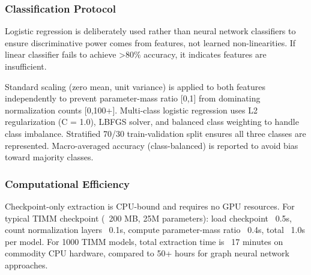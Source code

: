 \subsubsection{Classification Protocol}

Logistic regression is deliberately used rather than neural network classifiers to ensure discriminative power comes from features, not learned non-linearities. If linear classifier fails to achieve >80\% accuracy, it indicates features are insufficient.

Standard scaling (zero mean, unit variance) is applied to both features independently to prevent parameter-mass ratio [0,1] from dominating normalization counts [0,100+]. Multi-class logistic regression uses L2 regularization (C = 1.0), LBFGS solver, and balanced class weighting to handle class imbalance. Stratified 70/30 train-validation split ensures all three classes are represented. Macro-averaged accuracy (class-balanced) is reported to avoid bias toward majority classes.

\subsubsection{Computational Efficiency}

Checkpoint-only extraction is CPU-bound and requires no GPU resources. For typical TIMM checkpoint (~200 MB, 25M parameters): load checkpoint ~0.5s, count normalization layers ~0.1s, compute parameter-mass ratio ~0.4s, total ~1.0s per model. For 1000 TIMM models, total extraction time is ~17 minutes on commodity CPU hardware, compared to 50+ hours for graph neural network approaches.
